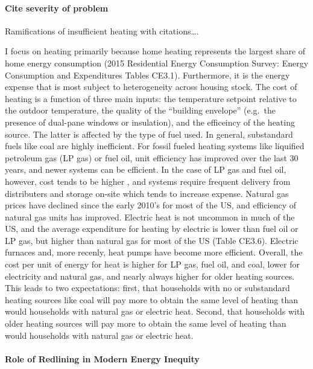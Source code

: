 \documentclass[
]{article}
\begin{document}
\hypertarget{cite-severity-of-problem}{%
\paragraph{Cite severity of problem}\label{cite-severity-of-problem}}

Ramifications of insufficient heating with citations\ldots.

I focus on heating primarily because home heating represents the largest share of home energy consumption \cite{EIARECS2015} (2015 Residential Energy Consumption Survey: Energy Consumption and Expenditures Tables CE3.1). Furthermore, it is the energy expense that is most subject to heterogeneity across housing stock. The cost of heating is a function of three main inputs: the temperature setpoint relative to the outdoor temperature, the quality of the ``building envelope'' (e.g.~the presence of dual-pane windows or insulation), and the efficeincy of the heating source. The latter is affected by the type of fuel used. In general, substandard fuels like coal are highly inefficient. For fossil fueled heating systems like liquified petroleum gas (LP gas) or fuel oil, unit efficiency has improved over the last 30 years, and newer systems can be efficient. In the case of LP gas and fuel oil, however, cost tends to be higher \cite{EIARECS2015}, and systems require frequent delivery from distributers and storage on-site which tends to increase expense. Natural gas prices have declined since the early 2010's for most of the US, and efficiency of natural gas units has improved. Electric heat is not uncommon in much of the US, and the average expenditure for heating by electric is lower than fuel oil or LP gas, but higher than natural gas for most of the US \citep{EIARECS2015} (Table CE3.6). Electric furnaces and, more recenly, heat pumps have become more efficient. Overall, the cost per unit of energy for heat is higher for LP gas, fuel oil, and coal, lower for electricity and natural gas, and nearly always higher for older heating sources. This leads to two expectations: first, that households with no or substandard heating sources like coal will pay more to obtain the same level of heating than would households with natural gas or electric heat. Second, that households with older heating sources will pay more to obtain the same level of heating than would households with natural gas or electric heat.

\hypertarget{role-of-redlining-in-modern-energy-inequity}{%
\paragraph{Role of Redlining in Modern Energy Inequity}\label{role-of-redlining-in-modern-energy-inequity}}
\end{document}
